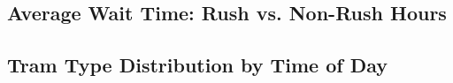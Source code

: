 \documentclass[a4paper, 10pt]{article}
\begin{document}
\begin{appendices}
			\newpage
			\subsection*{Average Wait Time: Rush vs. Non-Rush Hours}
				

			\newpage
			\subsection*{Tram Type Distribution by Time of Day}
				
	\end{appendices}
\end{document}

